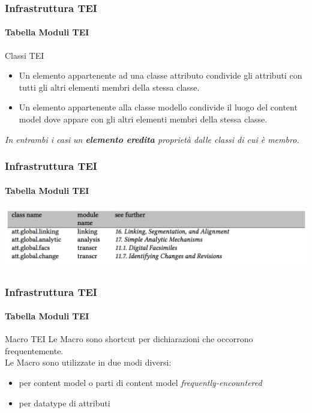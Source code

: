 \begin{frame}
    \frametitle{Infrastruttura TEI}
    \framesubtitle{Tabella Moduli TEI}
    \addtocounter{nframe}{1}
    
    \begin{block}{Classi TEI}
        \begin{itemize}
            \item Un elemento appartenente ad una classe attributo condivide gli attributi con tutti gli altri elementi membri della stessa classe. 
            \item Un elemento appartenente alla classe modello condivide il luogo del content model dove appare con gli altri elementi membri della stessa classe.
        \end{itemize}
    \end{block}
    \textit{ In entrambi i casi un \textbf{elemento eredita} proprietà dalle classi di cui è membro.}
\end{frame}

\begin{frame}
    \frametitle{Infrastruttura TEI}
    \framesubtitle{Tabella Moduli TEI}
    \addtocounter{nframe}{1}
        \begin{center}
        \includegraphics[width=.95\textwidth]{imgs/Classi-AttributiGlobaliModuli.png}
        \end{center}
\end{frame}


\begin{frame}
    \frametitle{Infrastruttura TEI}
    \framesubtitle{Tabella Moduli TEI}
    \addtocounter{nframe}{1}
    
    \begin{block}{Macro TEI}
        Le Macro sono shortcut per dichiarazioni che occorrono frequentemente. 
        \\ Le Macro sono utilizzate in due modi diversi:
        \begin{itemize}
            \item per content model o parti di content model \textit{frequently-encountered}
            \item per datatype di attributi
        \end{itemize}
         
    \end{block}
\end{frame}

